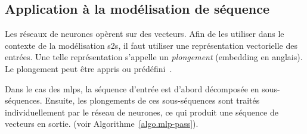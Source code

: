 \subsection{Application à la modélisation de séquence}

Les réseaux de neurones opèrent sur des vecteurs.
Afin de les utiliser dans le contexte de la modélisation \gls{s2s}, 
il faut utiliser une représentation vectorielle des entrées.
Une telle représentation s'appelle un \emph{plongement} (\foreignlanguage{english}{embedding} en anglais).
Le plongement peut être appris ou prédéfini~\cite{Raschka_Mirjalili_2017}.

Dans le cas des \glspl{mlp}, la séquence d'entrée est d'abord décomposée en sous-séquences.
Ensuite, les plongements de ces sous-séquences sont traités individuellement par le réseau de neurones,
ce qui produit une séquence de vecteurs en sortie.
(voir Algorithme~\ref{algo.mlp-pass}).



